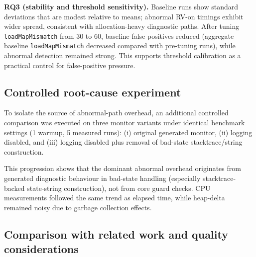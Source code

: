 \textbf{RQ3 (stability and threshold sensitivity).} Baseline runs show standard deviations that are modest relative to means; abnormal RV-on timings exhibit wider spread, consistent with allocation-heavy diagnostic paths. After tuning \texttt{loadMapMismatch} from 30 to 60, baseline false positives reduced (aggregate baseline \texttt{loadMapMismatch} decreased compared with pre-tuning runs), while abnormal detection remained strong. This supports threshold calibration as a practical control for false-positive pressure.

\subsection{Controlled root-cause experiment}

To isolate the source of abnormal-path overhead, an additional controlled comparison was executed on three monitor variants under identical benchmark settings (1 warmup, 5 measured runs): (i) original generated monitor, (ii) logging disabled, and (iii) logging disabled plus removal of bad-state stacktrace/string construction.

\begin{table}[ht]
    \centering
    \caption{Abnormal-path overhead across monitor variants (controlled 3-way comparison)}
    \label{tab:rv-overhead-variants}
    \scriptsize
\end{table}

This progression shows that the dominant abnormal overhead originates from generated diagnostic behaviour in bad-state handling (especially stacktrace-backed state-string construction), not from core guard checks. CPU measurements followed the same trend as elapsed time, while heap-delta remained noisy due to garbage collection effects.

\subsection{Comparison with related work and quality considerations}

